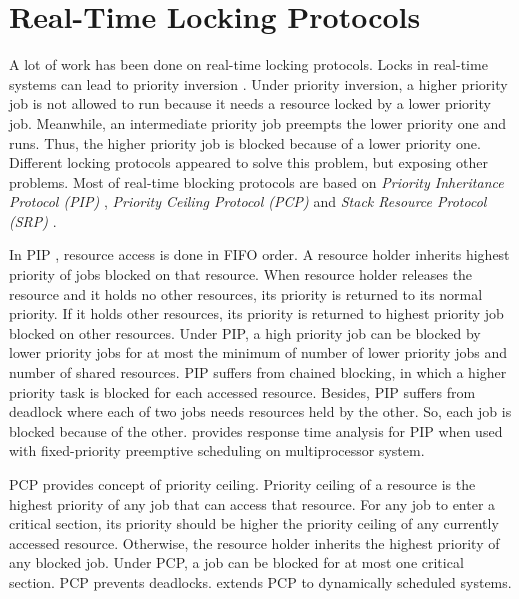 \documentclass[12pt,english]{report}
\begin{document}
\section{\label{sec:locking protocols}Real-Time Locking Protocols}
A lot of work has been done on real-time locking protocols. Locks
in real-time systems can lead to priority inversion \cite{Levine:2012:PIF:2148436.2148438,Buttazzo:2004:HRC:1027504}.
Under priority inversion, a higher priority job is not allowed to
run because it needs a resource locked by a lower priority job. Meanwhile,
an intermediate priority job preempts the lower priority one and runs.
Thus, the higher priority job is blocked because of a lower priority
one. Different locking protocols appeared to solve this problem, but
exposing other problems. Most of real-time blocking protocols are
based on \textit{Priority Inheritance Protocol (PIP)} \cite{sha1990priority,easwaran2009resource,Buttazzo:2004:HRC:1027504},
\textit{Priority Ceiling Protocol (PCP)} \cite{sha1990priority,easwaran2009resource,Buttazzo:2004:HRC:1027504,chen1990dynamic,6031129,Rajkumar:1991:SRS:532621,lakshmanan2009coordinated,rajkumar2002real}
and \textit{Stack Resource Protocol (SRP)} \cite{baker1991stack,Buttazzo:2004:HRC:1027504,990598}.

In PIP \cite{sha1990priority,Buttazzo:2004:HRC:1027504}, resource
access is done in FIFO order. A resource holder inherits highest priority
of jobs blocked on that resource. When resource holder releases the
resource and it holds no other resources, its priority is returned
to its normal priority. If it holds other resources, its priority
is returned to highest priority job blocked on other resources. Under
PIP, a high priority job can be blocked by lower priority jobs for
at most the minimum of number of lower priority jobs and number of
shared resources. PIP suffers from chained blocking, in which a higher
priority task is blocked for each accessed resource. Besides, PIP
suffers from deadlock where each of two jobs needs resources held by
the other. So, each job is blocked because of the other. \cite{easwaran2009resource}
provides response time analysis for PIP when used with fixed-priority
preemptive scheduling on multiprocessor system.

PCP \cite{sha1990priority,Buttazzo:2004:HRC:1027504,Rajkumar:1991:SRS:532621}
provides concept of priority ceiling. Priority ceiling of a resource
is the highest priority of any job that can access that resource.
For any job to enter a critical section, its priority should be higher
the priority ceiling of any currently accessed resource. Otherwise,
the resource holder inherits the highest priority of any blocked job.
Under PCP, a job can be blocked for at most one critical section.
PCP prevents deadlocks. \cite{chen1990dynamic} extends PCP to dynamically
scheduled systems.
\end{document}
